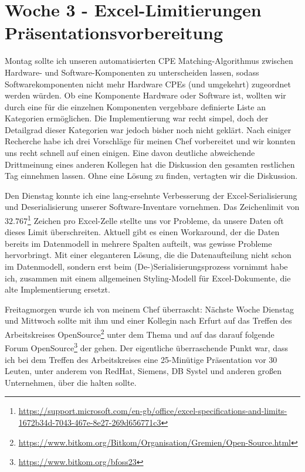 \section{Woche 3 - Excel-Limitierungen \headerand Präsentationsvorbereitung} \label{sec:bericht-wo-3}


\lweekdaymarginpar{\weekdayMondayLong}

Montag sollte ich unseren automatisierten CPE Matching-Algorithmus zwischen Hardware- und Software-Komponenten zu unterscheiden lassen, sodass Softwarekomponenten nicht mehr Hardware CPEs (und umgekehrt) zugeordnet werden würden.
Ob eine Komponente Hardware oder Software ist, wollten wir durch eine für die einzelnen Komponenten vergebbare definierte Liste an Kategorien ermöglichen.
Die Implementierung war recht simpel, doch der Detailgrad dieser Kategorien war jedoch bisher noch nicht geklärt.
Nach einiger Recherche habe ich drei Vorschläge für meinen Chef vorbereitet und wir konnten uns recht schnell auf einen einigen.
Eine davon deutliche abweichende Drittmeinung eines anderen Kollegen hat die Diskussion den gesamten restlichen Tag einnehmen lassen.
Ohne eine Lösung zu finden, vertagten wir die Diskussion.

\sweekdaymarginpar{\weekdayTuesdayShort\ - \weekdayThursdayShort}

Den Dienstag konnte ich eine lang-ersehnte Verbesserung der Excel-Serialisierung und Deserialisierung unserer Software-Inventare vornehmen.
Das Zeichenlimit von $32.767$\footnote{\url{https://support.microsoft.com/en-gb/office/excel-specifications-and-limits-1672b34d-7043-467e-8e27-269d656771c3}} Zeichen pro Excel-Zelle stellte uns vor Probleme, da unsere Daten oft dieses Limit überschreiten.
Aktuell gibt es einen Workaround, der die Daten bereits im Datenmodell in mehrere Spalten aufteilt, was gewisse Probleme hervorbringt.
Mit einer eleganteren Lösung, die die Datenaufteilung nicht schon im Datenmodell, sondern erst beim (De-)Serialisierungsprozess vornimmt habe ich, zusammen mit einem allgemeinen Styling-Modell für Excel-Dokumente, die alte Implementierung ersetzt.

\sweekdaymarginpar{\weekdayFridayLong}

Freitagmorgen wurde ich von meinem Chef überrascht:
Nächste Woche Dienstag und Mittwoch sollte mit ihm und einer Kollegin nach Erfurt auf das Treffen des Arbeitskreises OpenSource\footnote{\url{https://www.bitkom.org/Bitkom/Organisation/Gremien/Open-Source.html}} unter dem Thema  und auf das darauf folgende Forum OpenSource\footnote{\url{https://www.bitkom.org/bfoss23}} der {\bitkom} gehen.
Der eigentliche überraschende Punkt war, dass ich bei dem Treffen des Arbeitskreises eine 25-Minütige Präsentation vor 30 Leuten, unter anderem von RedHat, Siemens, DB Systel und anderen großen Unternehmen, über die  halten sollte.

